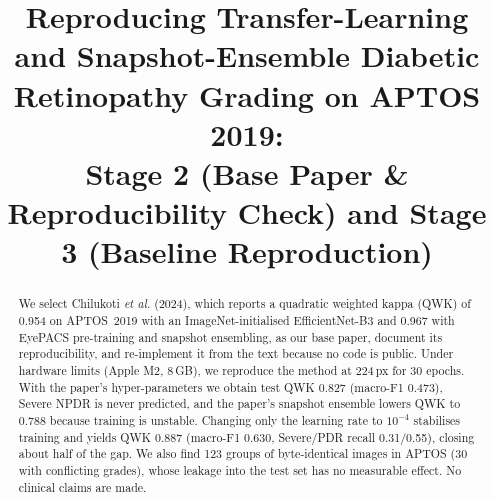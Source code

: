 \documentclass[conference]{IEEEtran}
\begin{document}
\title{Reproducing Transfer-Learning and Snapshot-Ensemble Diabetic Retinopathy Grading on APTOS 2019:\\
Stage 2 (Base Paper \& Reproducibility Check) and Stage 3 (Baseline Reproduction)}
\author{
}
\maketitle

\begin{abstract}
We select Chilukoti \emph{et al.} (2024), which reports a quadratic weighted kappa (QWK) of 0.954 on APTOS~2019
with an ImageNet-initialised EfficientNet-B3 and 0.967 with EyePACS pre-training and snapshot ensembling, as
our base paper, document its reproducibility, and re-implement it from the text because no code is public.
Under hardware limits (Apple M2, 8\,GB), we reproduce the method at 224\,px for 30 epochs. With the paper's
hyper-parameters we obtain test QWK 0.827 (macro-F1 0.473), Severe NPDR is never predicted, and the paper's
snapshot ensemble lowers QWK to 0.788 because training is unstable. Changing only the learning rate to
$10^{-4}$ stabilises training and yields QWK 0.887 (macro-F1 0.630, Severe/PDR recall 0.31/0.55), closing about
half of the gap. We also find 123 groups of byte-identical images in APTOS (30 with conflicting grades),
whose leakage into the test set has no measurable effect. No clinical claims are made.
\end{abstract}






\end{document}
